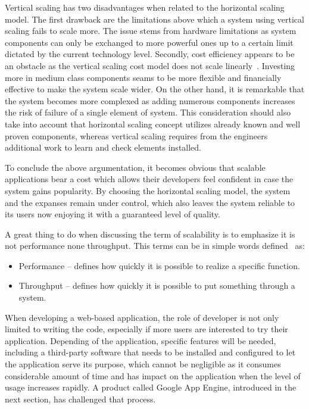 Vertical scaling has two disadvantages when related to the horizontal scaling model. The first drawback are the limitations above which a system using vertical scaling fails to scale more. The issue stems from hardware limitations as system components can only be exchanged to more powerful ones up to a certain limit dictated by the current technology level. Secondly, cost efficiency appears to be an obstacle as the vertical scaling cost model does not scale linearly~\cite[page 204]{build_scalable}. Investing more in medium class components seams to be more flexible and financially effective to make the system scale wider. On the other hand, it is remarkable that the system becomes more complexed as adding numerous components increases the risk of failure of a single element of system. This consideration should also take into account that horizontal scaling concept utilizes already known and well proven components, whereas vertical scaling requires from the engineers additional work to learn and check elements installed.

To conclude the above argumentation, it becomes obvious that scalable applications bear a cost which allows their developers feel confident in case the system gains popularity. By choosing the horizontal scaling model, the system and the expanses remain under control, which also leaves the system reliable to its users now enjoying it with a guaranteed level of quality.

A great thing to do when discussing the term of scalability is to  emphasize it is not performance none throughput. This terms can be in simple words defined~\cite{ruby_scalable} as:
\begin{itemize}
\item{Performance -- defines how quickly  it is possible to realize a specific function.}
\item{Throughput -- defines how quickly it is possible to put something through a system.}
\end{itemize}

When developing a web-based application, the role of developer is not only limited to writing the code, especially if more users are interested to try their application. Depending of the application, specific features will be needed, including a third-party software that needs to be installed and configured to let the application serve its purpose, which cannot be negligible as it consumes considerable amount of time and has impact on the application when the level of usage increases rapidly. A product called Google App Engine, introduced in the next section, has challenged that process.  
 
